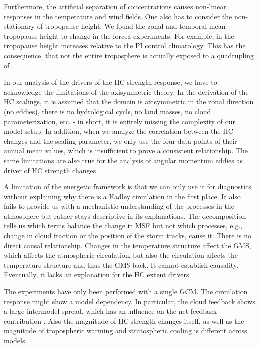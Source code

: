 Furthermore, the artificial separation of \CO concentrations causes non-linear responses in the temperature and wind fields. One also has to consider the non-stationary of tropopause height. We found the zonal and temporal mean tropopause height to change in the forced experiments. For example, in \tropo the tropopause height increases relative to the PI control climatology. This has the consequence, that not the entire troposphere is actually exposed to a quadrupling of \CO.

In our analysis of the drivers of the HC strength response, we have to acknowledge the limitations of the axisymmetric theory. In the derivation of the HC scalings, it is assumed that the domain is axisymmetric in the zonal direction (no eddies), there is no hydrological cycle, no land masses, no cloud parameterization, etc. - in short, it is entirely missing the complexity of our model setup. In addition, when we analyze the correlation between the HC changes and the scaling parameter, we only use the four data points of their annual mean values, which is insufficient to prove a consistent relationship. 
The same limitations are also true for the analysis of angular momentum eddies as driver of HC strength changes.

A limitation of the energetic framework is that we can only use it for diagnostics without explaining why there is a Hadley circulation in the first place. It also fails to provide us with a mechanistic understanding of the processes in the atmosphere but rather stays descriptive in its explanations. The decomposition tells us which terms balance the change in MSF but not which processes, e.g., change in cloud fraction or the position of the storm tracks, cause it. There is no direct causal relationship. Changes in the temperature structure affect the GMS, which affects the atmospheric circulation, but also the circulation affects the temperature structure and thus the GMS back. It cannot establish causality. Eventually, it lacks an explanation for the HC extent drivers.   

The experiments have only been performed with a single GCM. The circulation response might show a model dependency. In particular, the cloud feedback shows a large intermodel spread, which has an influence on the net feedback contribution \parencite{feldlCharacterizingHadleyCirculation2016}. Also the magnitude of HC strength changes itself, as well as the magnitude of tropospheric warming and stratospheric cooling is different across models.

